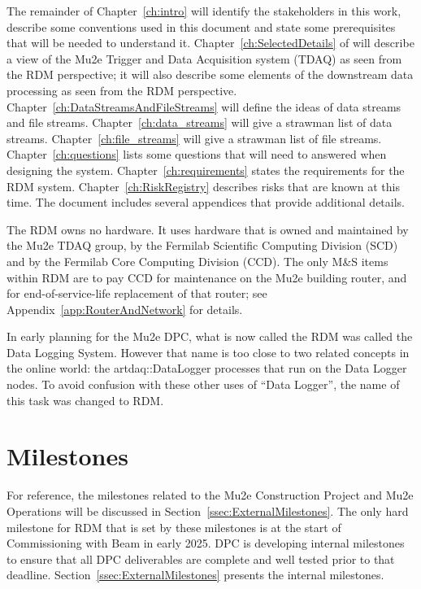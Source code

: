 The remainder of Chapter~\ref{ch:intro} will identify the stakeholders in this work,
describe some conventions used in this document and
state some prerequisites that will be needed to understand it.
Chapter~\ref{ch:SelectedDetails}  of will describe a view of the
Mu2e Trigger and Data Acquisition system (TDAQ) as seen from the RDM perspective;
it will also describe some elements of the downstream data processing as seen
from the RDM perspective.
Chapter~\ref{ch:DataStreamsAndFileStreams} will define the ideas of data streams and file streams.
Chapter~\ref{ch:data_streams} will give a strawman list of data streams.
Chapter~\ref{ch:file_streams} will give a strawman list of file streams.
Chapter~\ref{ch:questions} lists some questions that will need to answered when designing the system.
Chapter~\ref{ch:requirements} states the requirements for the RDM system.
Chapter~\ref{ch:RiskRegistry} describes risks that are known at this time.
The document includes several appendices that provide additional details.



The RDM owns no hardware.  It uses hardware that is owned and maintained
by the Mu2e TDAQ group,
by the Fermilab Scientific Computing Division (SCD)
and by the Fermilab Core Computing Division (CCD).
The only M\&S items within RDM are to pay CCD for maintenance on the Mu2e building router,
and for end-of-service-life replacement of that router;
see Appendix~\ref{app:RouterAndNetwork} for details.

In early planning for the Mu2e DPC, what is now called the RDM was called the Data Logging System.
However that name is too close to two related concepts in the online world:
the {\code artdaq::DataLogger} processes that run on the Data Logger nodes.
To avoid confusion with these other uses of ``Data Logger'',
the name of this task was changed to RDM.

\section{Milestones}
\label{sec:Milestones}

For reference, the milestones related to the Mu2e Construction Project and Mu2e Operations will
be discussed in Section~\ref{ssec:ExternalMilestones}.
The only hard milestone for RDM that is set by these milestones is at the start of
Commissioning with Beam in early 2025.
DPC is developing internal milestones to ensure that all DPC deliverables are
complete and well tested prior to that deadline.
Section~\ref{ssec:ExternalMilestones} presents the internal milestones.

